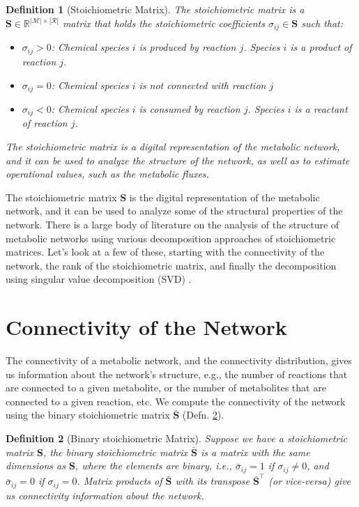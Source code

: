 \documentclass{article}[11pt]
\newtheorem{defn}{Definition}
\begin{document}
\begin{defn}[Stoichiometric Matrix]\label{defn-stoichiometric-matrix}
The stoichiometric matrix is a $\mathbf{S}\in\mathbb{R}^{|\mathcal{M}|\times|\mathcal{R}|}$ matrix that holds the stoichiometric coefficients $\sigma_{ij}\in\mathbf{S}$ such that:
   \begin{itemize}[leftmargin=16pt]
      \item{$\sigma_{ij}>0$: Chemical species $i$ is \textit{produced} by reaction $j$. Species $i$ is a product of reaction $j$.}
      \item{$\sigma_{ij} = 0$: Chemical species $i$ is not connected with reaction $j$}
      \item{$\sigma_{ij}<0$: Chemical species $i$ is \textit{consumed} by reaction $j$. Species $i$ is a reactant of reaction $j$.}
   \end{itemize}
   The stoichiometric matrix is a digital representation of the metabolic network, and it can be used to analyze the structure of the network, 
   as well as to estimate operational values, such as the metabolic fluxes.
\end{defn}

The stoichiometric matrix $\mathbf{S}$ is the digital representation of the metabolic network, and it can be used to analyze some of the structural properties of the network.
There is a large body of literature on the analysis of the structure of metabolic networks using various decomposition approaches of stoichiometric matrices. 
Let's look at a few of these, starting with the connectivity of the network, the rank of the stoichiometric matrix, 
and finally the decomposition using singular value decomposition (SVD) \cite{Famili:2003aa}.

\section{Connectivity of the Network}
The connectivity of a metabolic network, and the connectivity distribution, gives us information about the network's structure, e.g., 
the number of reactions that are connected to a given metabolite, or the number of metabolites that are connected to a given reaction, etc.
We compute the connectivity of the network using the binary stoichiometric matrix $\bar{\mathbf{S}}$ (Defn. \ref{defn-binary-stoichiometric-matrix}).

\begin{defn}[Binary stoichiometric Matrix]\label{defn-binary-stoichiometric-matrix}
Suppose we have a stoichiometric matrix $\mathbf{S}$, the binary stoichiometric matrix $\bar{\mathbf{S}}$ is a matrix with the same dimensions as $\mathbf{S}$, 
where the elements are binary, i.e., $\bar{\sigma}_{ij} = 1$ if $\sigma_{ij}\neq 0$, and $\bar{\sigma}_{ij} = 0$ if $\sigma_{ij} = 0$.
Matrix products of $\bar{\mathbf{S}}$ with its transpose $\bar{\mathbf{S}}^{\top}$ (or vice-versa) give us connectivity information about the network.
\end{defn}
\end{document}
